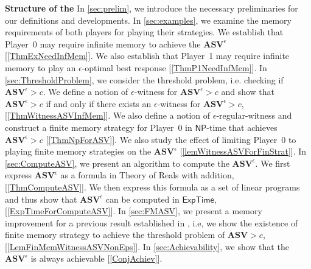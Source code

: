 \textbf{Structure of the \mydoc} In \cref{sec:prelim}, we introduce the necessary preliminaries for our definitions and developments. 
In \cref{sec:examples}, we examine the memory requirements of both players for playing their strategies. We establish that Player~0 may require infinite memory to achieve the $\mathbf{ASV}^{\epsilon}$ [\cref{ThmExNeedInfMem}]. We also establish that Player~1 may require infinite memory to play an $\epsilon$-optimal best response [\cref{ThmP1NeedInfMem}]. 
In \cref{sec:ThresholdProblem}, we consider the threshold problem, i.e. checking if $\mathbf{ASV}^{\epsilon} > c$. We define a notion of $\epsilon$-witness for $\mathbf{ASV}^{\epsilon} > c$ and show that $\mathbf{ASV}^{\epsilon} > c$ if and only if there exists an $\epsilon$-witness for $\mathbf{ASV}^{\epsilon} > c$, [\cref{ThmWitnessASVInfMem}]. We also define a notion of $\epsilon$-regular-witness and construct a finite memory strategy for Player~0 in $\mathsf{NP}$-time that achieves $\mathbf{ASV}^{\epsilon} > c$ [\cref{ThmNpForASV}]. We also study the effect of limiting Player~0 to playing finite memory strategies on the $\mathbf{ASV}^{\epsilon}$ [\cref{lemWitnessASVForFinStrat}].
In \cref{sec:ComputeASV}, we present an algorithm to compute the $\mathbf{ASV}^{\epsilon}$. We first express $\mathbf{ASV}^{\epsilon}$ as a formula in Theory of Reals with addition, [\cref{ThmComputeASV}]. We then express this formula as a set of linear programs and thus show that $\mathbf{ASV}^{\epsilon}$ can be computed in $\mathsf{ExpTime}$, [\cref{ExpTimeForComputeASV}].
In \cref{sec:FMASV}, we present a memory improvement for a previous result established in \cite{FGR20}, i.e, we show the existence of finite memory strategy to achieve the threshold problem of $\mathbf{ASV} > c$, [\cref{LemFinMemWitnessASVNonEps}]. 
In \cref{sec:Achievability}, we show that the $\mathbf{ASV}^{\epsilon}$ is always achievable [\cref{ConjAchiev}].